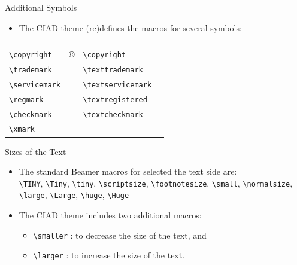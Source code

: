 \documentclass[english,sectioncirclenumberstyle]{ciadbeamer}
\begin{document}
\begin{frame}{Additional Symbols}
	\begin{itemize}
	\item The CIAD theme (re)defines the macros for several symbols:
	\end{itemize}
	\begin{tabularx}{\linewidth}{|l|X|l|X|}
	\hline
	\tabularheading\multicolumn{2}{|c|}{\chead{From CIAD theme}} & \multicolumn{2}{c|}{\chead{From \TeX}} \\
	\hline
	\texttt{{\textbackslash}copyright} & \copyright & \texttt{{\textbackslash}copyright} & \textcopyright \\
	\hline
	\texttt{{\textbackslash}trademark} & \trademark & \texttt{{\textbackslash}texttrademark} & \texttrademark \\
	\hline
	\texttt{{\textbackslash}servicemark} & \servicemark & \texttt{{\textbackslash}textservicemark} & \textservicemark \\
	\hline
	\texttt{{\textbackslash}regmark} & \regmark & \texttt{{\textbackslash}textregistered} & \textregistered \\
	\hline
	\texttt{{\textbackslash}checkmark} & \checkmark & \texttt{{\textbackslash}textcheckmark} & \textcheckmark \\
	\hline
	\texttt{{\textbackslash}xmark} & \xmark & & \\
	\hline
	\end{tabularx}
\end{frame}

\begin{frame}{Sizes of the Text}
	\begin{itemize}
	\item The standard Beamer macros for selected the text side are: \\
		{\TINY\texttt{{\textbackslash}TINY}}, {\Tiny\texttt{{\textbackslash}Tiny}}, {\tiny\texttt{{\textbackslash}tiny}}, {\scriptsize\texttt{{\textbackslash}scriptsize}}, {\footnotesize\texttt{{\textbackslash}footnotesize}}, {\small\texttt{{\textbackslash}small}}, {\normalsize\texttt{{\textbackslash}normalsize}}, {\large\texttt{{\textbackslash}large}}, {\Large\texttt{{\textbackslash}Large}}, {\huge\texttt{{\textbackslash}huge}}, {\Huge\texttt{{\textbackslash}Huge}}
	\vspace{1em}
	\item The CIAD theme includes two additional macros:
		\begin{itemize}
		\item \texttt{{\textbackslash}smaller} : to decrease the size of the text, and
		\item \texttt{{\textbackslash}larger} : to increase the size of the text.
		\end{itemize}
	\end{itemize}
\end{frame}
\end{document}
